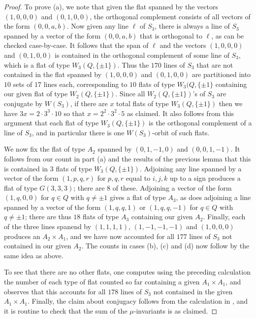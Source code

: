 \documentclass[11pt, reqno]{amsart}
\numberwithin{equation}{section}
\theoremstyle{definition}
\theoremstyle{plain}
\begin{document}
\begin{proof}
To prove (a), we note that given the flat spanned by the vectors $(1,0,0,0)$ and $(0,1,0,0)$, the orthogonal complement consists of all vectors of the form $(0,0,a,b)$. Now given any line $\ell$ of $S_3$, there is always a line of $S_3$ spanned by a vector of the form $(0,0,a,b)$ that is orthogonal to $\ell$, as can be checked case-by-case. It follows that the span of $\ell$ and the vectors $(1,0,0,0)$ and $(0,1,0,0)$ is contained in the orthogonal complement of some line of $S_3$, which is a flat of type $W_3(Q,\{ \pm 1 \})$. Thus the $170$ lines of $S_3$ that are not contained in the flat spanned by $(1,0,0,0)$ and $(0,1,0,0)$ are partitioned into $10$ sets of $17$ lines each, corresponding to $10$ flats of type $W_3(Q,\{\pm 1\}$ containing our given flat of type $W_2(Q,\{\pm 1\})$. Since all $W_2(Q,\{\pm 1\})$'s of $S_3$ are conjugate by $W(S_3)$, if there are $x$ total flats of type $W_3(Q,\{\pm 1\})$ then we have $3x=2 \cdot 3^3 \cdot 10$ so that $x=2^2 \cdot 3^2 \cdot 5$ as claimed. It also follows from this argument that each flat of type $W_3(Q,\{\pm 1\})$ is the orthogonal complement of a line of $S_3$, and in particular there is one $W(S_3)$-orbit of such flats.

We now fix the flat of type $A_2$ spanned by $(0,1,-1,0)$ and $(0,0,1,-1)$. It follows from our count in part (a) and the results of the previous lemma that this is contained in $3$ flats of type $W_3(Q,\{\pm 1\})$. Adjoining any line spanned by a vector of the form $(1,p,q,r)$ for $p,q,r$ equal to $i,j,k$ up to a sign produces a flat of type $G(3,3,3)$; there are $8$ of these. Adjoining a vector of the form $(1,q,0,0)$ for $q \in Q$ with $q \neq \pm 1$ gives a flat of type $A_3$, as does adjoining a line spanned by a vector of the form $(1,q,q,1)$ or $(1,q,q,-1)$ for $q \in Q$ with $q \neq \pm 1$; there are thus $18$ flats of type $A_3$ containing our given $A_2$. Finally, each of the three lines spanend by $(1,1,1,1)$, $(1,-1,-1,-1)$ and $(1,0,0,0)$ produces an $A_2 \times A_1$, and we have now accounted for all $177$ lines of $S_3$ not contained in our given $A_2$. The counts in cases (b), (c) and (d) now follow by the same idea as above. 

To see that there are no other flats, one computes using the preceding calculation the number of each type of flat counted so far containing a given $A_1 \times A_1$, and observes that this accounts for all $178$ lines of $S_3$ not contained in the given $A_1 \times A_1$. Finally, the claim about conjugacy follows from the calculation in \cite{BST}, and it is routine to check that the sum of the $\mu$-invariants is as claimed. 
\end{proof}
\end{document}
